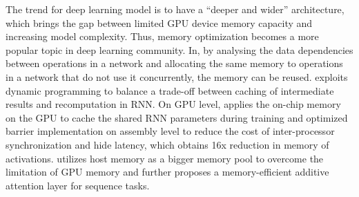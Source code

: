 \documentclass{article}
\begin{document}
The trend for deep learning model is to have a “deeper and wider” architecture, which brings the gap between limited GPU device memory capacity and increasing model complexity. Thus, memory optimization becomes a more popular topic in deep learning community. In\cite{chen2015mxnet}, by analysing the data dependencies between operations in a network and allocating the same memory to operations in a network that do not use it concurrently, the memory can be reused.  \cite{gruslys2016memory} exploits dynamic programming to balance a trade-off between caching of intermediate results and recomputation in RNN. On GPU level, \cite{diamos2016persistent} applies the on-chip memory on the GPU to cache the shared RNN parameters during training and optimized barrier implementation on assembly level to reduce the cost of inter-processor synchronization and hide latency, which obtains 16x reduction in memory of activations. \cite{mengtraining} utilizes host memory as a bigger memory pool to overcome the limitation of GPU memory and further proposes a memory-efficient additive attention layer\cite{bahdanau2014neural} for sequence tasks.


\end{document}
